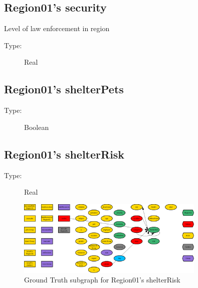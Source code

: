 \documentclass{article}%
\begin{document}
%
\subsection{Region01's security}%
\label{subsec:Region01's security}%
Level of law enforcement in region%
\begin{description}%
\item[Type:]%
Real%
\end{description}

%
\subsection{Region01's shelterPets}%
\label{subsec:Region01's shelterPets}%
\begin{description}%
\item[Type:]%
Boolean%
\end{description}

%
\subsection{Region01's shelterRisk}%
\label{subsec:Region01's shelterRisk}%
\begin{description}%
\item[Type:]%
Real%
\end{description}%


\begin{figure}[ht]%
\centering%
\includegraphics[width=0.8\textwidth]{images/shelterRiskOfRegion01.png}%
\caption{Ground Truth subgraph for Region01's shelterRisk}%
\end{figure}

%
\end{document}
